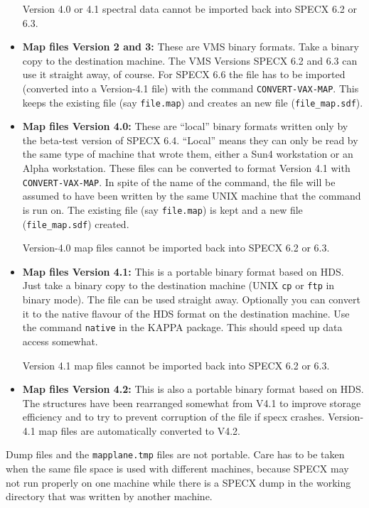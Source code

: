 \documentclass[twoside,11pt,nolof]{starlink}
\begin{document}
\begin{itemize}
    Version 4.0 or 4.1 spectral data cannot be imported back into SPECX
    6.2 or 6.3.

\item \textbf{Map files Version 2 and 3:}
    These are VMS binary formats. Take a binary
    copy to the destination machine. The VMS Versions SPECX 6.2 and 6.3
    can use it straight away, of course. For SPECX 6.6 the file has to
    be imported (converted into a Version-4.1 file) with the command
    \texttt{CONVERT-VAX-MAP}. This keeps the existing file (say \texttt{file.map}) and creates an new file (\texttt{file\_map.sdf}).

\item \textbf{Map files Version 4.0:}
    These are ``local'' binary formats written only by
    the beta-test version of SPECX 6.4. ``Local'' means they can only be
    read by the same type of machine that wrote them, either a Sun4
    workstation or an Alpha workstation. These files can be converted to
    format Version 4.1 with \texttt{CONVERT-VAX-MAP}. In spite of the name of the
    command, the file will be assumed to have been written by the same
    UNIX machine that the command is run on. The existing file (say
    \texttt{file.map}) is kept and a new file (\texttt{file\_map.sdf}) created.

    Version-4.0 map files cannot be imported back into SPECX 6.2 or 6.3.

\item \textbf{Map files Version 4.1:}
    This is a portable binary format based on HDS.
    Just take a binary copy to the destination machine (UNIX \texttt{cp} or
    \texttt{ftp} in binary mode). The file can be used straight away.
    Optionally you can convert it to the native flavour of the HDS
    format on the destination machine. Use the command \texttt{native} in the
    KAPPA package. This should speed up data access somewhat.

    Version 4.1 map files cannot be imported back into SPECX 6.2 or 6.3.

\item \textbf{Map files Version 4.2:}
    This is also a portable binary format based on HDS. The structures
have been rearranged somewhat from V4.1 to improve storage efficiency
and to try to prevent corruption of the file if specx crashes. Version-4.1
map files are automatically converted to V4.2.

\end{itemize}

Dump files and the \texttt{mapplane.tmp} files are not portable. Care has to
be taken when the same file space is used with different machines,
because SPECX may not run properly on one machine while there is a SPECX
dump in the working directory that was written by another machine.
\end{document}
